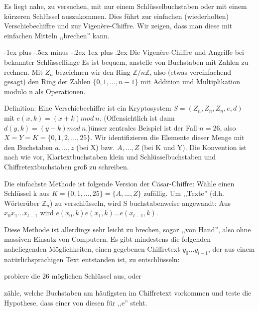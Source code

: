 \documentclass[a4paper]{article}
\makeatletter
\renewcommand{\subsubsection}{\@startsection{subsubsection}{3}{0mm}%
 {-1ex plus -.5ex minus -.2ex}%
 {1ex plus .2ex}%
 {\normalfont\small\bfseries}}
\makeatother
\begin{document}
\begin{multicols}{3}
    Es liegt nahe, zu versuchen, mit nur einem Schlüsselbuchstaben oder mit einem kürzeren Schlüssel auszukommen. Dies führt zur einfachen (wiederholten) Verschiebechiffre und zur Vigenère-Chiffre. Wir zeigen, dass man diese mit einfachen Mitteln ,,brechen'' kann.

    \subsubsection{Die Vigenère-Chiffre und Angriffe bei bekannter Schlüssellänge}
    Es ist bequem, anstelle von Buchstaben mit Zahlen zu rechnen. Mit $Z_n$ bezeichnen wir den Ring $\mathbb{Z}/n\mathbb{Z}$, also (etwas vereinfachend gesagt) den Ring der Zahlen $\{0,1,...,n-1\}$ mit Addition und Multiplikation modulo n als Operationen.

    Definition: Eine Verschiebechiffre ist ein Kryptosystem $S=(Z_n,Z_n,Z_n,e,d)$ mit $e(x,k)=(x+k) mod\ n$. (Offensichtlich ist dann $d(y,k)=(y-k)mod\ n$.)ünser zentrales Beispiel ist der Fall $n=26$, also $X=Y=K=\{0,1,2,...,25\}$. Wir identifizieren die Elemente dieser Menge mit den Buchstaben $a,...,z$ (bei X) bzw. $A,...,Z$ (bei K und Y). Die Konvention ist nach wie vor, Klartextbuchstaben klein und Schlüsselbuchstaben und Chiffretextbuchstaben groß zu schreiben.

    Die einfachste Methode ist folgende Version der Cäsar-Chiffre: Wähle einen Schlüssel k aus $K=\{0,1,...,25\}=\{A,...,Z\}$ zufällig. Um ,,Texte'' (d.h. Wörterüber $\mathbb{Z}_n$) zu verschlüsseln, wird S buchstabenweise angewandt: Aus $x_0 x_1...x_{l-1}$ wird $e(x_0,k)e(x_1,k)...e(x_{l-1},k)$.

    Diese Methode ist allerdings sehr leicht zu brechen, sogar ,,von Hand'', also ohne massiven Einsatz von Computern. Es gibt mindestens die folgenden naheliegenden Möglichkeiten, einen gegebenen Chiffretext $y_0...y_{l-1}$, der aus einem natürlichsprachigen Text entstanden ist, zu entschlüsseln:
    \begin{enumerate*}
        \item probiere die 26 möglichen Schlüssel aus, oder
        \item  zähle, welche Buchstaben am häufigsten im Chiffretext vorkommen und teste die Hypothese, dass einer von diesen für ,,e'' steht.
    \end{enumerate*}


\end{multicols}
\end{document}
